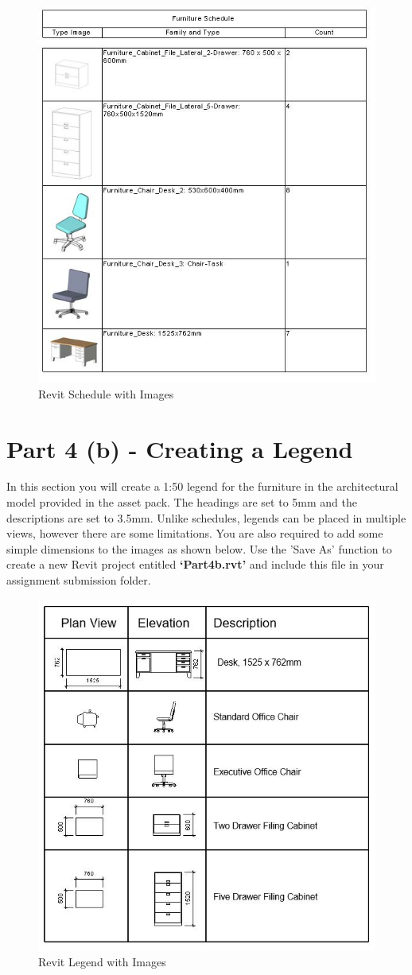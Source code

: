 \begin{figure}[h]
	\centering
	\includegraphics[width=0.7\linewidth]{img/RevitSchedule.jpg}
	\caption{Revit Schedule with Images}
	\label{fig:ScheduleWithImages}
\end{figure}


\newpage


\section*{Part 4 (b) - Creating a Legend}
In this section you will create a 1:50 legend for the furniture in the architectural model provided in the asset pack. The headings are set to 5mm and the descriptions are set to 3.5mm. Unlike schedules, legends can be placed in multiple views, however there are some limitations. You are also required to add some simple dimensions to the images as shown below. Use the 'Save As' function to create a new Revit project entitled \textbf{‘Part4b.rvt’} and include this file in your assignment submission folder.


\begin{figure}[h]
	\centering
	\includegraphics[width=0.7\linewidth]{img/RevitLegend.jpg}
	\caption{Revit Legend with Images}
	\label{fig:RevitLegend}
\end{figure}


